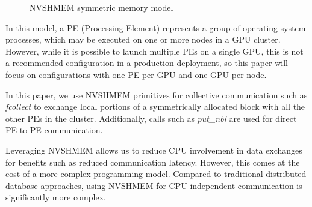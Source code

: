\begin{figure}[h]
    \centering
    \captionsetup{justification=centering}
    
    \caption{NVSHMEM symmetric memory model}
    \label{fig:nvshmem_sym_mem}
\end{figure}

In this model, a PE (Processing Element) represents a group of operating system processes, which may be executed on one or more nodes in a GPU cluster\cite{NVSHMEM2023}.
However, while it is possible to launch multiple PEs on a single GPU, this is not a recommended configuration in a production deployment, so this paper will focus on configurations with one PE per GPU and one GPU per node.

In this paper, we use NVSHMEM primitives for collective communication such as \textit{fcollect} to exchange local portions of a symmetrically allocated block with all the other PEs in the cluster.
Additionally, calls such as \textit{put\_nbi} are used for direct PE-to-PE communication.

Leveraging NVSHMEM allows us to reduce CPU involvement in data exchanges for benefits such as reduced communication latency.
However, this comes at the cost of a more complex programming model.
Compared to traditional distributed database approaches, using NVSHMEM for CPU independent communication is significantly more complex.

